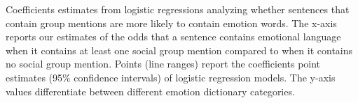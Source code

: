 Coefficients estimates from logistic regressions analyzing whether sentences that contain group mentions are more likely to contain emotion words. The x-axis reports our estimates of the odds that a sentence contains emotional language when it contains at least one social group mention compared to when it contains no social group mention. Points (line ranges) report the coefficients point estimates (95\% confidence intervals) of logistic regression models. The y-axis values differentiate between different emotion dictionary categories. \label{fig:regression_coefficients}
